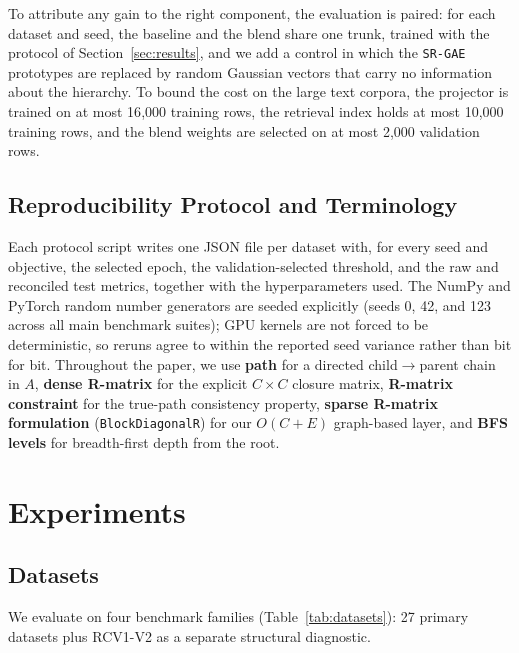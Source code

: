 \documentclass[preprint,12pt]{elsarticle}
\begin{document}
To attribute any gain to the right component, the evaluation is paired: for
each dataset and seed, the baseline and the blend share one trunk, trained
with the protocol of Section~\ref{sec:results}, and we add a control in which
the \texttt{SR-GAE} prototypes are replaced by random Gaussian vectors that
carry no information about the hierarchy. To bound the cost on the large text
corpora, the projector is trained on at most 16{,}000 training rows, the
retrieval index holds at most 10{,}000 training rows, and the blend weights
are selected on at most 2{,}000 validation rows.

\subsection{Reproducibility Protocol and Terminology}

Each protocol script writes one JSON file per dataset with, for every seed
and objective, the selected epoch, the validation-selected threshold, and the
raw and reconciled test metrics, together with the hyperparameters used. The
NumPy and PyTorch random number generators are seeded explicitly (seeds 0, 42,
and 123 across all main benchmark suites); GPU kernels are not forced to be
deterministic, so reruns agree to within the reported seed variance rather
than bit for bit. Throughout the paper, we use
\textbf{path} for a directed child$\rightarrow$parent chain in $A$,
\textbf{dense R-matrix} for the explicit $C \times C$ closure matrix,
\textbf{R-matrix constraint} for the true-path consistency property,
\textbf{sparse R-matrix formulation} (\texttt{BlockDiagonalR}) for our
$O(C{+}E)$ graph-based layer, and \textbf{BFS levels} for breadth-first depth
from the root.

\section{Experiments}

\subsection{Datasets}

We evaluate on four benchmark families (Table~\ref{tab:datasets}): 27
primary datasets plus RCV1-V2 as a separate structural diagnostic.
\end{document}
